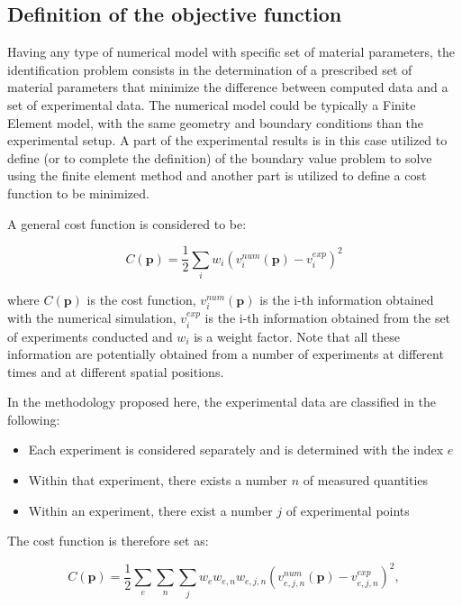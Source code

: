 \subsection{Definition of the objective function}

Having any type of numerical model with specific set of material parameters, the identification problem consists in the determination of a prescribed set of material parameters that minimize the difference between computed data and a set of experimental data. The numerical model could be typically a Finite Element model, with the same geometry and boundary conditions than the experimental setup. A part of the experimental results is in this case utilized to define (or to complete the definition) of the boundary value problem to solve using the finite element method and another part is utilized to define a cost function to be minimized.

A general cost function is considered to be:

\begin{equation}
C(\mathbf{p}) = \frac{1}{2} \sum_i w_i \left( {v_i^{num}(\mathbf{p}) - v_i^{exp}} \right)^2
\end{equation}

\noindent where $C(\mathbf{p})$ is the cost function, $v_i^{num}(\mathbf{p})$ is the i-th information obtained with the numerical simulation, $v_i^{exp}$ is the i-th information obtained from the set of experiments conducted and $w_i$ is a weight factor. Note that all these information are potentially obtained from a number of experiments at different times and at different spatial positions.

In the methodology proposed here, the experimental data are classified in the following:

\begin{itemize}
\item Each experiment is considered separately and is determined with the index $e$
\item Within that experiment, there exists a number $n$ of measured quantities
\item Within an experiment, there exist a number $j$ of experimental points
\end{itemize}

The cost function is therefore set as: 

\begin{equation}
C(\mathbf{p}) = \frac{1}{2} \sum_e \sum_n \sum_j w_e w_{e,n} w_{e,j,n} \left( {v_{e,j,n}^{num}(\mathbf{p}) - v_{e,j,n}^{exp}} \right)^2,
\end{equation}

